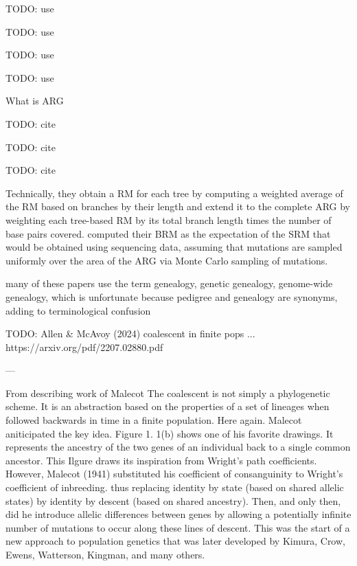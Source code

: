 TODO: use \cite{kelleher2019inferring}

TODO: use \cite{zhang2023biobank}

TODO: use \cite{harris2023using}

TODO: use \cite{deng2024robust}

What is ARG

TODO: cite \citep{wong2023general}

TODO: cite \citep{lewanski2024era}

TODO: cite \citep{brandt2024promise}

Technically, they obtain a RM for each tree by computing a weighted average of the RM based on branches by their length and extend it to the complete ARG by weighting each tree-based RM by its total branch length times the number of base pairs covered.
%
\citet{zhang2023biobank} computed their BRM as the expectation of the SRM that would be obtained using sequencing data, assuming that mutations are sampled uniformly over the area of the ARG via Monte Carlo sampling of mutations.
%


many of these papers use the term genealogy, genetic genealogy, genome-wide genealogy,
which is unfortunate because pedigree and genealogy are synonyms, adding to terminological confusion

TODO: Allen \& McAvoy (2024) coalescent in finite pops ... https://arxiv.org/pdf/2207.02880.pdf


---

From \cite{slatkin2002modern} describing work of Malecot
The coalescent is not simply a phylogenetic scheme. It is an abstraction based on the
properties of a set of lineages when followed backwards in time in a finite population.
Here again. Malecot aniticipated the key idea. Figure 1. 1(b) shows one of his favorite
drawings. It represents the ancestry of the two genes of an individual back to a single
common ancestor. This Ilgure draws its inspiration from Wright's path coefficients.
However, Malecot (1941) substituted his coefficient of consanguinity to Wright's
coefficient of inbreeding. thus replacing identity by state (based on shared allelic states)
by identity by descent (based on shared ancestry). Then, and only then, did he introduce
allelic differences between genes by allowing a potentially infinite number of mutations
to occur along these lines of descent. This was the start of a new approach to population
genetics that was later developed by Kimura, Crow, Ewens, Watterson, Kingman, and many others.

